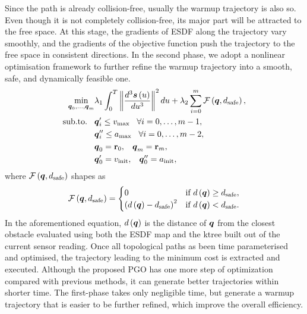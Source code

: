 Since the path is already collision-free, usually the warmup trajectory is also so. Even though it is not completely collision-free,
its major part will be attracted to the free space. At this stage, the gradients of ESDF along the trajectory vary smoothly,
and the gradients of the objective function push the trajectory to the free space in consistent directions.
In the second phase, we adopt a nonlinear optimisation framework to further refine the warmup trajectory into a smooth, safe,
and dynamically feasible one.
\begin{equation}%
	\label{EQ:REPLANNING-SECOND-PHASE}
	\begin{split}
	\min_{\bs{\cpoint}_{0}, \dots, \bs{\cpoint}_{\cpnumber}} &
				\lambda_1 \int_0^{T} \norm{\frac{d^3 \bs{\spline} \lp \splinevar \rp}{d \splinevar^3}}^2 d \splinevar
				+ \lambda_2 \sum_{i=0}^{\cpnumber} \mathcal{F} \lp \bs{\cpoint}, d_{\text{safe}}\rp, \\
	\text{sub.to.} \hspace{0.3cm} &
				\bs{\cpoint}_i' \le v_{\text{max}} \hspace{0.3cm} \forall i = 0, \dots, \cpnumber-1, \\
				& \bs{\cpoint}_i'' \le a_{\text{max}} \hspace{0.3cm} \forall i = 0, \dots, \cpnumber-2, \\
				& \bs{\cpoint}_0 = \rr_0, \hspace{0.3cm} \bs{\cpoint}_{\cpnumber} = \rr_{\cpnumber}, \\
				& \bs{\cpoint}_0' = v_{\text{init}}, \hspace{0.3cm} \bs{\cpoint}_0'' = a_{\text{init}},
	\end{split}
\end{equation}
where $\mathcal{F} \left( \boldsymbol{q}, d_{\text{safe}} \right)$ shapes as
\begin{equation*}
    \mathcal{F} \left( \boldsymbol{q}, d_{\text{safe}} \right) =
    \begin{cases}
        0 & \text{if } d \left( \boldsymbol{q} \right) \ge d_{\text{safe}}, \\
        \left( d \left( \boldsymbol{q} \right) - d_{\text{safe}} \right)^2 & \text{if } d \left( \boldsymbol{q} \right) < d_{\text{safe}}.
    \end{cases}
\end{equation*}
In the aforementioned equation, $d \left( \boldsymbol{q} \right)$ is the distance of $\boldsymbol{q}$ from the closest obstacle evaluated using both
the ESDF map and the ktree built out of the current sensor reading.
Once all topological paths as been time parameterised and optimised, the trajectory leading to the minimum cost is extracted and executed.
Although the proposed PGO has one more step of optimization compared with previous methods, it can generate better trajectories within
shorter time. The first-phase takes only negligible time, but generate a warmup trajectory that is easier to be further refined,
which improve the overall efficiency.


